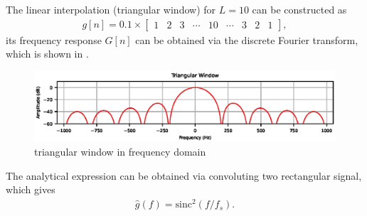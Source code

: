 The linear interpolation (triangular window) for $L=10$ can be constructed as
\begin{gather}
g[n]=0.1\times\begin{bmatrix}
1&2&3&\cdots&10&\cdots&3&2&1
\end{bmatrix},
\end{gather}
its frequency response $G[n]$ can be obtained via the discrete Fourier transform, which is shown in .
\begin{figure}[htb!]
\centering
\includegraphics{PIC/TriangularWindow}
\caption{triangular window in frequency domain}\label{fig:tri_window}
\end{figure}
The analytical expression can be obtained via convoluting two rectangular signal, which gives
\begin{gather}\label{eq:tri_kernel}
\hat{g}\left(f\right)=\text{sinc}^2\left(f/f_s\right).
\end{gather}

